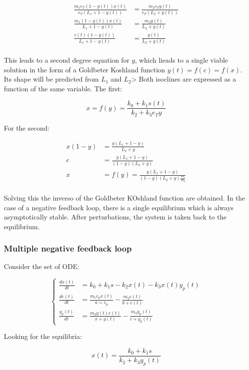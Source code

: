     \begin{align*}
      \frac{m_1e_T(1-y(t))x(t)}{e_T(L_1+1-y(t))} &= \frac{m_2e_Ty(t)}{e_T(L_2+y(t))}\\
      \frac{m_1(1-y(t))x(t)}{L_1+1-y(t)} &= \frac{m_2y(t)}{L_2+y(t)}\\
      \frac{c(t)(1-y(t))}{L_1 + 1-y(t)} &= \frac{y(t)}{L_2 + y(t)}\\
    \end{align*}

    This leads to a second degree equation for $y$, which lieads to a single viable solution in the form of a Goldbeter Koshland function $y(t) = f(c) = f(x)$.
    Its shape will be predicted from $L_1$ and $L_2$>
    Both isoclines are expressed as a function of the same variable.
    The first:

    $$x = f(y) = \frac{k_0 + k_1s(t)}{k_2 + k_3e_Ty}$$

    For the second:

    \begin{align*}
      x(1-y) &= \frac{y(L_1+1-y)}{L_2+y}\\
      c &= \frac{y(L_1+1-y)}{(1-y)(L_2+y)}\\
      x &= f(y) = \frac{y(L_1 + 1-y)}{(1-y)(L_2+y)\frac{m_1}{m_2}}\\
    \end{align*}

    Solving this the inverso of the Goldbeter KOshland function are obtained.
    In the case of a negative feedback loop, there is a single equilibrium which is always asymptotically stable.
    After perturbations, the system is taken back to the equilibrium.

    \subsubsection{Multiple negative feedback loop}
    Consider the set of ODE:

    $$\begin{cases}
      \frac{dx(t)}{dt} &= k_0 + k_1s -k_2x(t) - k_3x(t)y_p(t)\\
      \frac{de(t)}{dt} &= \frac{m_1e_px(t)}{a = e_p} - \frac{m_2e(t)}{b + e(t)}\\
      \frac{y_p(t)}{dt} &= \frac{m_3y(t)e(t)}{x+y(t)} - \frac{m_4y_p(t)}{c+y_p(t)}
    \end{cases}$$

    Looking for the equilibria:

    $$x(t) = \frac{k_0 + k_1s}{k_2 + k_3y_p(t)}$$

